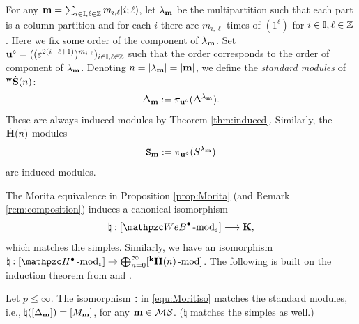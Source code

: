For any $\mathbf{m}=\sum_{i\in \mathbb{I},\ell\in \mathbb{Z}}m_{i,\ell} [i;\ell) $, let $\lambda_{\mathbf{m}}$ be the multipartition such that each part is a column partition and for each $i$ there are $m_{i,\ell}$ times of  $(1^{\ell})$ for $i\in \mathbb{I},\ell\in \mathbb{Z} $. Here we fix some order of the component of $\lambda_{\mathbf{m}}$. 
Set $\mathbf{u}^\diamond=((\varepsilon^{2(i-\ell+1)})^{m_{i,\ell}})_{i\in \mathbb{I},\ell\in \mathbb{Z}}$ such that the order corresponds to the order of component of $\lambda_{\mathbf{m}}$. Denoting $n=|\lambda_{\mathbf{m}}| =|\mathbf{m}|$, we define the {\em standard modules} of ${}^{\bold{w}}\dot{\bold{S}}(n)$:
 \begin{align}  \label{eq:std}
\Delta_{\mathbf{m}}:= \pi_{\mathbf{u}^\diamond}(\Delta^{\lambda_{\mathbf{m}}}).
\end{align}
These are always induced modules by Theorem \ref{thm:induced}. 
Similarly, the $\dot{\bf H}(n)$-modules  
\[
\texttt S_{\mathbf{m}}:= \pi_{\mathbf{u}^\diamond}( S^{\lambda_{\mathbf{m}}})
\]
are induced modules. 

The Morita equivalence in Proposition \ref{prop:Morita} (and Remark \ref{rem:composition}) induces a canonical isomorphism 
\begin{equation}
\label{equ:Moritiso}
    \natural: [\qAW \modf_\eps]\longrightarrow  \K,
\end{equation}
which matches the simples. 
Similarly, we have an isomorphism $\natural: [\qAH\modf_\eps] \rightarrow\bigoplus_{n=0}^\infty[\KH(n)\modf]$. The following is built on the induction theorem from \cite{KL87} and \cite{Ar96}.

\begin{theorem} \label{thm:ind=std}
Let $p\le \infty$. The isomorphism $\natural$ in \eqref{equ:Moritiso} matches the standard modules, i.e., 
$\natural([\Delta_{\mathbf{m}}] )= [M_{\mathbf{m}}]$, for any $\mathbf{m}\in\mathcal{M}\mathcal{S}$. ($\natural$ matches the simples as well.)
\end{theorem}


